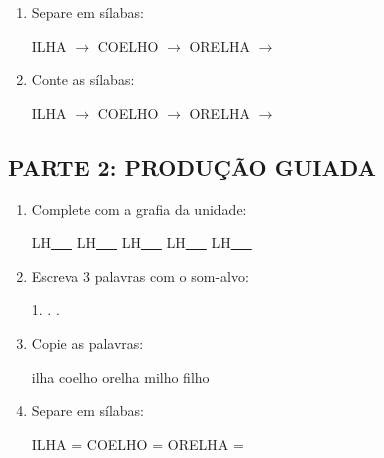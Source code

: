 \begin{exercicio}
\begin{enumerate}
  \item Separe em sílabas:
  \begin{center}
  ILHA $\rightarrow$ \underline{\hspace{1cm}} \quad COELHO $\rightarrow$ \underline{\hspace{1cm}} \quad ORELHA $\rightarrow$ \underline{\hspace{1cm}}
  \end{center}

  \item Conte as sílabas:
  \begin{center}
  ILHA $\rightarrow$ \underline{\hspace{0.9cm}} \quad COELHO $\rightarrow$ \underline{\hspace{0.9cm}} \quad ORELHA $\rightarrow$ \underline{\hspace{0.9cm}}
  \end{center}

\end{enumerate}

\subsection*{PARTE 2: PRODUÇÃO GUIADA}

\begin{enumerate}[resume]

  \item Complete com a grafia da unidade:
  \begin{center}
  LH\underline{~~~} \quad LH\underline{~~~} \quad LH\underline{~~~} \quad LH\underline{~~~} \quad LH\underline{~~~}
  \end{center}

  \item Escreva 3 palavras com o som-alvo:
  \begin{center}
  1. \underline{\hspace{3cm}} . \underline{\hspace{3cm}} . \underline{\hspace{3cm}}
  \end{center}

  \item Copie as palavras:
  \begin{center}
  ilha \quad coelho \quad orelha \quad milho \quad filho
  \end{center}

  \item Separe em sílabas:
  \begin{center}
  ILHA = \underline{\hspace{1cm}} \underline{\hspace{1cm}} \quad COELHO = \underline{\hspace{1cm}} \underline{\hspace{1cm}} \quad ORELHA = \underline{\hspace{1cm}} \underline{\hspace{1cm}}
  \end{center}


\end{enumerate}
\end{exercicio}
